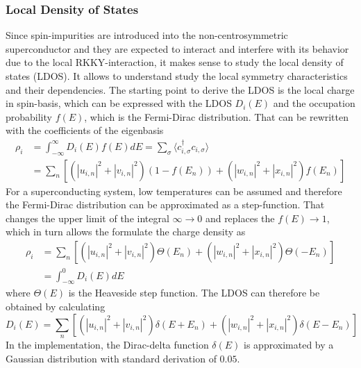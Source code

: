 \subsubsection{Local Density of States}
Since spin-impurities are introduced into the non-centrosymmetric superconductor and they are expected to interact and interfere with its behavior due to the local RKKY-interaction, it makes sense to study the local density of states (LDOS).
It allows to understand study the local symmetry characteristics and their dependencies. \newline
The starting point to derive the LDOS is the local charge in spin-basis, which can be expressed with the LDOS $D_i(E)$ and the occupation probability $f(E)$, which is the Fermi-Dirac distribution.
That can be rewritten with the coefficients of the eigenbasis
\begin{align}\nonumber
    \rho_i &= \int_{-\infty}^{\infty} D_i(E)f(E)dE = \sum_{\sigma} \langle c^{\dag}_{i,\sigma} c_{i,\sigma}\rangle\\ \nonumber
    &= \sum_n\left[  
    \left( |u_{i,n}|^2 + |v_{i,n}|^2\right)\left( 1- f(E_n) \right) + \left(|w_{i,n}|^2 + |x_{i,n}|^2\right)f(E_n)
    \right]
\end{align}
For a superconducting system, low temperatures can be assumed and therefore the Fermi-Dirac distribution can be approximated as a step-function.
That changes the upper limit of the integral $\infty \rightarrow 0$ and replaces the $f(E) \rightarrow 1$, which in turn allows the formulate the charge density as 
\begin{align}\nonumber
    \rho_i &= \sum_n\left[  
    \left( |u_{i,n}|^2 + |v_{i,n}|^2\right)\Theta(E_n) + \left(|w_{i,n}|^2 + |x_{i,n}|^2\right)\Theta(-E_n)
    \right] \\ \nonumber
    &= \int_{-\infty}^0 D_i(E) dE
\end{align}
where $\Theta(E)$ is the Heaveside step function.
The LDOS can therefore be obtained by calculating
\begin{equation}\label{eq:LDOS_num}
    D_i(E) = \sum_n\left[  
    \left( |u_{i,n}|^2 + |v_{i,n}|^2\right)\delta(E+E_n) + \left(|w_{i,n}|^2 + |x_{i,n}|^2\right)\delta(E-E_n)
    \right]
\end{equation}
In the implementation, the Dirac-delta function $\delta(E)$ is approximated by a Gaussian distribution with standard derivation of $0.05$.
